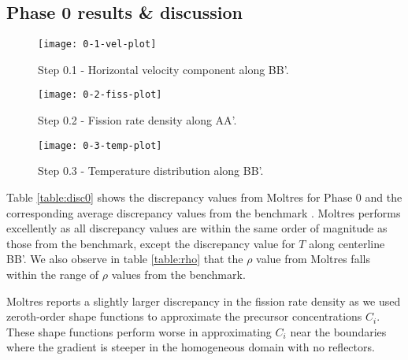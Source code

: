 \subsection{Phase 0 results \& discussion}
%
\begin{figure}[h!]
	\centering
    \texttt{[image: 0-1-vel-plot]}
	\caption{Step 0.1 - Horizontal velocity component along BB'.}
	\label{fig:0.1}
\end{figure}
%
\begin{figure}[h!]
	\centering
	\texttt{[image: 0-2-fiss-plot]}
	\caption{Step 0.2 - Fission rate density along AA'.}
	\label{fig:0.2}
\end{figure}
%
\begin{figure}[h!]
	\centering
	\texttt{[image: 0-3-temp-plot]}
	\caption{Step 0.3 - Temperature distribution along BB'.}
	\label{fig:0.3}
\end{figure}

Table \ref{table:disc0} shows the discrepancy values from Moltres for Phase 0
and the corresponding average discrepancy values from the benchmark
\citep{tiberga_results_2020}. Moltres performs excellently as all discrepancy
values are within the same order of magnitude as those from the benchmark,
except the discrepancy value for $T$ along centerline BB'. We also observe in
table \ref{table:rho} that the $\rho$ value from Moltres falls within the
range of $\rho$ values from the benchmark.

Moltres reports a slightly larger discrepancy in the fission rate density as
we used zeroth-order shape functions to approximate the precursor
concentrations $C_i$. These shape functions perform worse in approximating
$C_i$ near the boundaries where the gradient is steeper in the homogeneous
domain with no reflectors.

